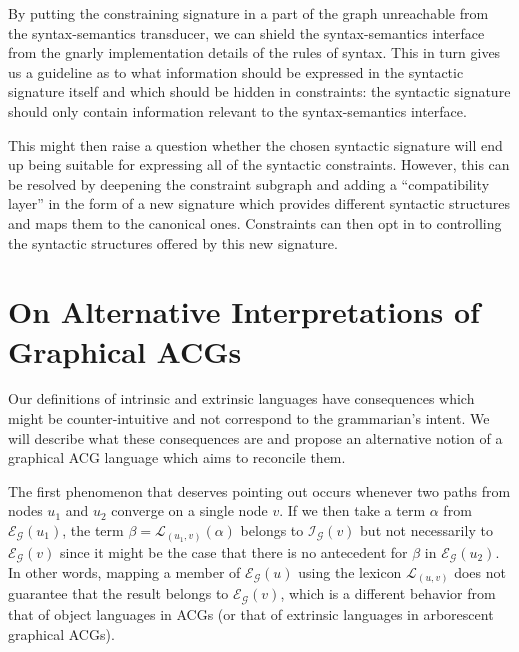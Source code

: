By putting the constraining signature in a part of the graph unreachable
from the syntax-semantics transducer, we can shield the syntax-semantics
interface from the gnarly implementation details of the rules of
syntax. This in turn gives us a guideline as to what information should
be expressed in the syntactic signature itself and which should be
hidden in constraints: the syntactic signature should only contain
information relevant to the syntax-semantics interface.

This might then raise a question whether the chosen syntactic signature
will end up being suitable for expressing all of the syntactic
constraints. However, this can be resolved by deepening the constraint
subgraph and adding a ``compatibility layer'' in the form of a new
signature which provides different syntactic structures and maps them to
the canonical ones. Constraints can then opt in to controlling the
syntactic structures offered by this new signature.


\section{On Alternative Interpretations of Graphical ACGs}

Our definitions of intrinsic and extrinsic languages have consequences
which might be counter-intuitive and not correspond to the grammarian's
intent. We will describe what these consequences are and propose an
alternative notion of a graphical ACG language which aims to reconcile
them.

The first phenomenon that deserves pointing out occurs whenever two
paths from nodes $u_1$ and $u_2$ converge on a single node $v$. If we
then take a term $\alpha$ from $\mathcal{E}_{\mathcal{G}}(u_1)$, the
term $\beta = \mathcal{L}_{(u_1,v)}(\alpha)$ belongs to
$\mathcal{I}_{\mathcal{G}}(v)$ but not necessarily to
$\mathcal{E}_{\mathcal{G}}(v)$ since it might be the case that there is
no antecedent for $\beta$ in $\mathcal{E}_{\mathcal{G}}(u_2)$. In other
words, mapping a member of $\mathcal{E}_{\mathcal{G}}(u)$ using the
lexicon $\mathcal{L}_{(u,v)}$ does not guarantee that the result belongs
to $\mathcal{E}_{\mathcal{G}}(v)$, which is a different behavior from
that of object languages in ACGs (or that of extrinsic languages in
arborescent graphical ACGs).

